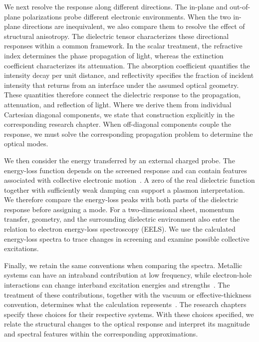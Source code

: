 We next resolve the response along different directions.
The in-plane and out-of-plane polarizations probe different electronic environments.
When the two in-plane directions are inequivalent, we also compare them to resolve the effect of structural anisotropy.
The dielectric tensor characterizes these directional responses within a common framework.
In the scalar treatment, the refractive index determines the phase propagation of light, whereas the extinction coefficient characterizes its attenuation.
The absorption coefficient quantifies the intensity decay per unit distance, and reflectivity specifies the fraction of incident intensity that returns from an interface under the assumed optical geometry.
These quantities therefore connect the dielectric response to the propagation, attenuation, and reflection of light.
Where we derive them from individual Cartesian diagonal components, we state that construction explicitly in the corresponding research chapter.
When off-diagonal components couple the response, we must solve the corresponding propagation problem to determine the optical modes.

We then consider the energy transferred by an external charged probe.
The energy-loss function depends on the screened response and can contain features associated with collective electronic motion~\cite{thygesen2017}.
A zero of the real dielectric function together with sufficiently weak damping can support a plasmon interpretation.
We therefore compare the energy-loss peaks with both parts of the dielectric response before assigning a mode.
For a two-dimensional sheet, momentum transfer, geometry, and the surrounding dielectric environment also enter the relation to electron energy-loss spectroscopy (EELS).
We use the calculated energy-loss spectra to trace changes in screening and examine possible collective excitations.

Finally, we retain the same conventions when comparing the spectra.
Metallic systems can have an intraband contribution at low frequency, while electron-hole interactions can change interband excitation energies and strengths~\cite{onida2002electronic}.
The treatment of these contributions, together with the vacuum or effective-thickness convention, determines what the calculation represents~\cite{matthes2016influence}.
The research chapters specify these choices for their respective systems.
With these choices specified, we relate the structural changes to the optical response and interpret its magnitude and spectral features within the corresponding approximations.

